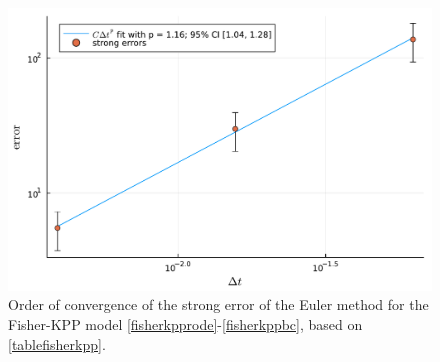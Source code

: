 \documentclass[reqno,12pt]{amsart}
\theoremstyle{plain} %
\theoremstyle{definition} %
\begin{document}
\begin{figure}[htb]
    \includegraphics[scale=0.6]{img/order_fisherkpp.pdf}
    \caption{Order of convergence of the strong error of the Euler method for the Fisher-KPP model \eqref{fisherkpprode}-\eqref{fisherkppbc}, based on \cref{tablefisherkpp}.}
    \label{figfisherkpp}
\end{figure}
\end{document}
